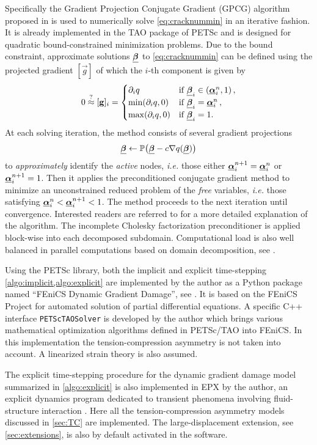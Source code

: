 Specifically the Gradient Projection Conjugate Gradient (GPCG) algorithm proposed in \cite{MoreToraldo:1991} is used to numerically solve \eqref{eq:cracknummin} in an iterative fashion. It is already implemented in the TAO package of PETSc and is designed for quadratic bound-constrained minimization problems. Due to the bound constraint, approximate solutions $\bvec$ to \eqref{eq:cracknummin} can be defined using the projected gradient $[\vec{g}]$ of which the $i$-th component is given by
\[
0\overset{?}{\approx}[\vec{g}]_i=\begin{cases}
\partial_i q & \text{if $\bvec_i\in(\dvec_i^n,1)$}\,, \\
\min(\partial_i q, 0) & \text{if $\bvec_i=\dvec_i^n$}\,, \\
\max(\partial_i q, 0) & \text{if $\bvec_i=1$}.
\end{cases}
\]
At each solving iteration, the method consists of several gradient projections
\[
\bvec\gets\mathbb{P}\bigl(\bvec-c\nabla q(\bvec)\bigr)
\]
to \emph{approximately} identify the \emph{active} nodes, \emph{i.e.} those either $\dvec_i^{n+1}=\dvec_i^n$ or $\dvec_i^{n+1}=1$. Then it applies the preconditioned conjugate gradient method to minimize an unconstrained reduced problem of the \emph{free} variables, \emph{i.e.} those satisfying $\dvec_i^n<\dvec_i^{n+1}<1$. The method proceeds to the next iteration until convergence. Interested readers are referred to \cite{MoreToraldo:1991} for a more detailed explanation of the algorithm. The incomplete Cholesky factorization preconditioner is applied block-wise into each decomposed subdomain. Computational load is also well balanced in parallel computations based on domain decomposition, see \cite{BensonMcInnesMore:2001}.

Using the PETSc library, both the implicit and explicit time-stepping \cref{algo:implicit,algo:explicit} are implemented by the author as a Python package named ``FEniCS Dynamic Gradient Damage'', see \cite{LiMaurini:2015}. It is based on the FEniCS Project \cite{LoggMardalWells:2012} for automated solution of partial differential equations. A specific C++ interface \texttt{PETScTAOSolver} is developed by the author which brings various mathematical optimization algorithms defined in PETSc/TAO into FEniCS. In this implementation the tension-compression asymmetry is not taken into account. A linearized strain theory is also assumed.

The explicit time-stepping procedure for the dynamic gradient damage model summarized in \cref{algo:explicit} is also implemented in EPX by the author, an explicit dynamics program dedicated to transient phenomena involving fluid-structure interaction \cite{EPX:2015}. Here all the tension-compression asymmetry models discussed in \cref{sec:TC} are implemented. The large-displacement extension, see \cref{sec:extensions}, is also by default activated in the software.

